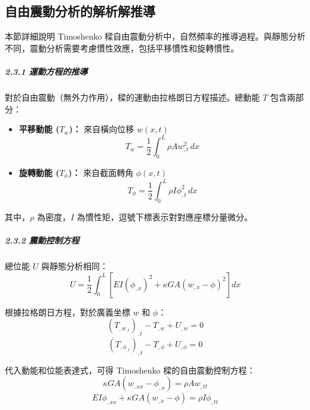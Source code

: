 ﻿\documentclass[UTF8, a4paper, 12pt]{ctexart}
\begin{document}
\subsection{自由震動分析的解析解推導}

本節詳細說明 Timoshenko 樑自由震動分析中，自然頻率的推導過程。與靜態分析不同，震動分析需要考慮慣性效應，包括平移慣性和旋轉慣性。

\subparagraph{2.3.1 運動方程的推導}

對於自由震動（無外力作用），樑的運動由拉格朗日方程描述。總動能 $T$ 包含兩部分：

\begin{itemize}
  \item \textbf{平移動能 ($T_w$)：} 來自橫向位移 $w(x,t)$
  \begin{equation}
    T_w = \frac{1}{2}\int_0^L \rho A w_{,t}^2 \, dx
  \end{equation}
  
  \item \textbf{旋轉動能 ($T_\phi$)：} 來自截面轉角 $\phi(x,t)$
  \begin{equation}
    T_\phi = \frac{1}{2}\int_0^L \rho I \phi_{,t}^2 \, dx
  \end{equation}
\end{itemize}

其中，$\rho$ 為密度，$I$ 為慣性矩，逗號下標表示對對應座標分量微分。

\subparagraph{2.3.2 震動控制方程}

總位能 $U$ 與靜態分析相同：
\begin{equation}
  U = \frac{1}{2}\int_0^L \left[ EI\left(\phi_{,x}\right)^2 + \kappa GA\left(w_{,x} - \phi\right)^2 \right] dx
\end{equation}

根據拉格朗日方程，對於廣義坐標 $w$ 和 $\phi$：
\begin{equation}
  \left(T_{,w_{,t}}\right)_{,t} - T_{,w} + U_{,w} = 0
\end{equation}
\begin{equation}
  \left(T_{,\phi_{,t}}\right)_{,t} - T_{,\phi} + U_{,\phi} = 0
\end{equation}

代入動能和位能表達式，可得 Timoshenko 樑的自由震動控制方程：
\begin{equation}
  \kappa GA \left( w_{,xx} - \phi_{,x} \right) = \rho A w_{,tt}
\end{equation}
\begin{equation}
  EI \phi_{,xx} + \kappa GA \left( w_{,x} - \phi \right) = \rho I \phi_{,tt}
\end{equation}
\end{document}
